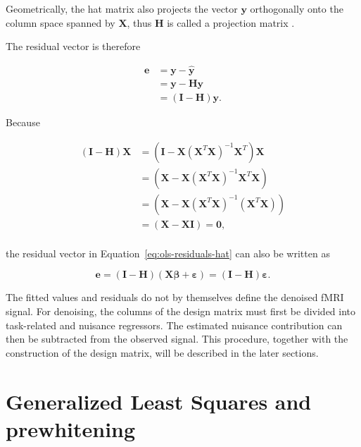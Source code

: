 \documentclass[english]{pwr_wmat_praca_dyplomowa}
\theoremstyle{definition}
\theoremstyle{remark}
\begin{document}
Geometrically, the hat matrix also projects the vector $\mathbf{y}$ orthogonally onto the column space spanned by $\mathbf{X}$, thus $\mathbf{H}$ is called a projection matrix \cite{hat-matrix}.

The residual vector is therefore

\begin{align}
    \label{eq:ols-residuals}
    \mathbf{e} &= \mathbf{y}-\widehat{\mathbf{y}} \\
    &= \mathbf{y}-\mathbf{H}\mathbf{y} \\
    &= \left(\mathbf{I}-\mathbf{H}\right)\mathbf{y}.
    \label{eq:ols-residuals-hat}
\end{align}

Because

\begin{equation}
    \begin{aligned}
        \left(\mathbf{I}-\mathbf{H}\right)\mathbf{X} &= \left(\mathbf{I}- \mathbf{X} \left(\mathbf{X}^T\mathbf{X}\right)^{-1}\mathbf{X}^T\right)\mathbf{X} \\
        &= \left(\mathbf{X}- \mathbf{X} \left(\mathbf{X}^T\mathbf{X}\right)^{-1}\mathbf{X}^T\mathbf{X}\right) \\
        &= \left(\mathbf{X}- \mathbf{X} \left(\mathbf{X}^T\mathbf{X}\right)^{-1}\left(\mathbf{X}^T\mathbf{X}\right)\right) \\
        &= \left(\mathbf{X}- \mathbf{X} \mathbf{I}\right) = \mathbf{0}, \\
    \end{aligned}
    \label{eq:hat-zeroing}
\end{equation}

the residual vector in Equation~\eqref{eq:ols-residuals-hat} can also be written as

\begin{equation}
    \mathbf{e} = (\mathbf{I}-\mathbf{H}) (\mathbf{X}\boldsymbol{\beta} + \boldsymbol{\varepsilon}) = (\mathbf{I}-\mathbf{H})\boldsymbol{\varepsilon}.
\end{equation}

The fitted values and residuals do not by themselves define the denoised fMRI signal. For denoising, the columns of the design matrix must first be divided into task-related and nuisance regressors. The estimated nuisance contribution can then be subtracted from the observed signal. This procedure, together with the construction of the design matrix, will be described in the later sections.

\section{Generalized Least Squares and prewhitening}
\label{section:gls-prewhitening}
\end{document}
